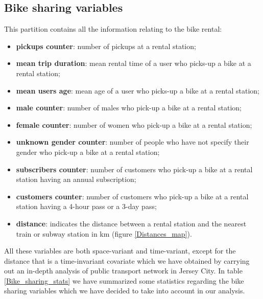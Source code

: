 \subsection{Bike sharing variables}
This partition contains all the information relating to the bike rental: 
\begin{itemize}
	\item \textbf{pickups counter}: number of pickups at a rental station;
	\item \textbf{mean trip duration}: mean rental time of a user who picks-up a bike at a rental station;
	\item \textbf{mean users age}: mean age of a user who picks-up a bike at a rental station;
	\item \textbf{male counter}: number of males who pick-up a bike at a rental station;
	\item \textbf{female counter}: number of women who pick-up a bike at a rental station;
	\item \textbf{unknown gender counter}: number  of people who have not specify their gender who pick-up a bike at a rental station;
	\item \textbf{subscribers counter}: number of customers who pick-up a bike at a rental station having an annual subscription;
	\item \textbf{customers counter}: number of customers who pick-up a bike at a rental station having a \num{4}-hour pass or a \num{3}-day pass;
	\item \textbf{distance}: indicates the distance between a rental station and the nearest train or subway station in \unit{\kilo\meter} (figure \ref{Distances_map}).
	
\end{itemize}
All these variables are both space-variant and time-variant, except for the distance that is a time-invariant covariate which we have obtained by carrying out an in-depth analysis of public transport network in Jersey City. In table \ref{Bike_sharing_stats} we have summarized some statistics regarding the bike sharing variables which we have decided to take into account in our analysis.

